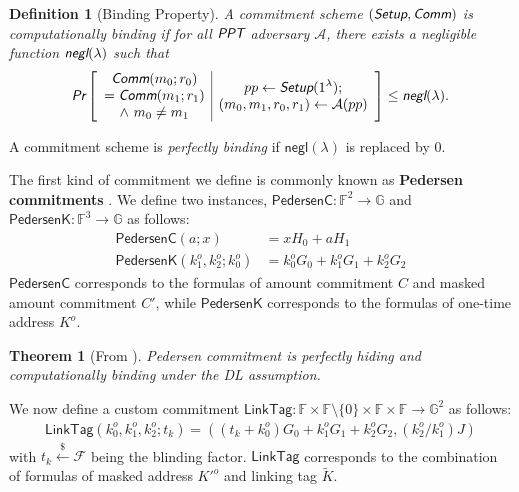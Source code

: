 \documentclass{article}
\theoremstyle{plain}
\newtheorem{definition}{Definition}[section]
\newtheorem{theorem}{Theorem}[section]
\theoremstyle{remark}
\begin{document}
\begin{definition}[Binding Property]
A commitment scheme $(\emph{\textsf{Setup}}, \emph{\textsf{Comm}})$ is computationally binding if for all $\emph{\textsf{PPT}}$ adversary $\mathcal{A}$, there exists a negligible function $\emph{\textsf{negl}}(\lambda)$ such that
\begin{align*}
\emph{\textsf{Pr}}
\left[
\begin{array}{c|c}
    \begin{gathered}
         \emph{\textsf{Comm}}(m_0;r_0) \\
        = \emph{\textsf{Comm}}(m_1;r_1) \\
        \wedge\ m_0 \ne m_1
    \end{gathered}
    &
    \begin{gathered}
        pp\leftarrow\emph{\textsf{Setup}}(1^{\lambda}); \\
        (m_0,m_1,r_0,r_1)\leftarrow\mathcal{A}(pp)
    \end{gathered}
\end{array}
\right]
\le \emph{\textsf{negl}}(\lambda).
\end{align*}
\end{definition}
A commitment scheme is \textit{perfectly binding} if $\textsf{negl}(\lambda)$ is replaced by $0$.

\noindent The first kind of commitment we define is commonly known as \textbf{Pedersen commitments} \cite{pedersen}. We define two instances, $\textsf{PedersenC}:\mathbb{F}^2\rightarrow\mathbb{G}$ and $\textsf{PedersenK}:\mathbb{F}^3\rightarrow\mathbb{G}$ as follows:
\begin{align*}
\textsf{PedersenC}(a; x) &= x H_0 + a H_1 \\
\textsf{PedersenK}(k_1^o, k_2^o; k_0^o) &= k_0^o G_0 + k_1^o G_1 + k_2^o G_2
\end{align*}
$\textsf{PedersenC}$ corresponds to the formulas of amount commitment $C$ and masked amount commitment $C'$, while $\textsf{PedersenK}$ corresponds to the formulas of one-time address $K^o$.
\begin{theorem}[From \cite{pedersen}]\label{thm-pedersen}
Pedersen commitment is perfectly hiding and computationally binding under the DL assumption.
\end{theorem}

\noindent We now define a custom commitment $\textsf{LinkTag}:\mathbb{F}\times\mathbb{F}\setminus\{0\}\times\mathbb{F}\times\mathbb{F}\rightarrow\mathbb{G}^2$ as follows:
\begin{align*}
\textsf{LinkTag}(k_0^o, k_1^o, k_2^o; t_k) = ((t_k + k_0^o) G_0 + k_1^o G_1 + k_2^o G_2, (k_2^o/k_1^o) J)
\end{align*}
with $t_k\xleftarrow{\$}\mathcal{F}$ being the blinding factor. $\textsf{LinkTag}$ corresponds to the combination of formulas of masked address $K'^o$ and linking tag $\tilde{K}$.
\end{document}
